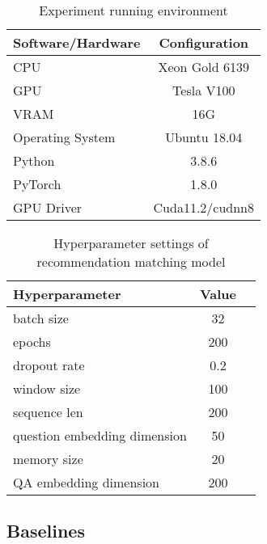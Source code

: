 \begin{table}[htbp!]
    \caption{Experiment running environment}\label{tbl:ch4-exp-env}
    \centering
    \begin{tabular}{l c}
        \toprule
        Software/Hardware & Configuration   \\
        \midrule
        CPU               & Xeon Gold 6139  \\
        GPU               & Tesla V100      \\
        VRAM              & 16G             \\
        Operating System  & Ubuntu 18.04    \\
        Python            & 3.8.6           \\
        PyTorch           & 1.8.0           \\
        GPU Driver        & Cuda11.2/cudnn8 \\
        \bottomrule
    \end{tabular}
\end{table}

\begin{table}[htb]
    \caption{Hyperparameter settings of recommendation matching model}\label{tbl:ch4-hpsetting}
    \centering
    \begin{tabular}{l c c}
        \toprule
        Hyperparameter               & Value \\
        \midrule
        batch size                   & 32    \\
        epochs                       & 200   \\
        dropout rate                 & 0.2   \\
        window size                  & 100   \\
        sequence len                 & 200   \\
        question embedding dimension & 50    \\
        memory size                  & 20    \\
        QA embedding dimension       & 200   \\
        \bottomrule
    \end{tabular}
\end{table}

\subsection{Baselines}

